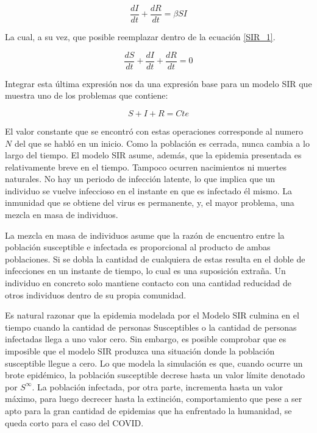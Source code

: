 \begin{equation} \frac{dI}{dt} + \frac{dR}{dt} = \beta S I \end{equation}

La cual, a su vez, que posible reemplazar dentro de la ecuación \eqref{SIR_1}.

\begin{equation} \frac{dS}{dt} + \frac{dI}{dt} + \frac{dR}{dt} = 0 \end{equation}

Integrar esta última expresión nos da una expresión base para un modelo SIR que muestra uno de los problemas que contiene:

\begin{equation} S + I + R = Cte \end{equation}

El valor constante que se encontró con estas operaciones corresponde al numero $N$ del que se habló en un inicio. Como la población es cerrada, nunca cambia a lo largo del tiempo. El modelo SIR asume, además, que la epidemia presentada es relativamente breve en el tiempo. Tampoco ocurren nacimientos ni muertes naturales. No hay un periodo de infección latente, lo que implica que un individuo se vuelve infeccioso en el instante en que es infectado él mismo. La inmunidad que se obtiene del virus es permanente, y, el mayor problema, una mezcla en masa de individuos.

La mezcla en masa de individuos asume que la razón de encuentro entre la población susceptible e infectada es proporcional al producto de ambas poblaciones. Si se dobla la cantidad de cualquiera de estas resulta en el doble de infecciones en un instante de tiempo, lo cual es una suposición extraña. Un individuo en concreto solo mantiene contacto con una cantidad reducidad de otros individuos dentro de su propia comunidad.

Es natural razonar que la epidemia modelada por el Modelo SIR culmina en el tiempo cuando la cantidad de personas Susceptibles o la cantidad de personas infectadas llega a uno valor cero. Sin embargo, es posible comprobar que es imposible que el modelo SIR produzca una situación donde la población susceptible llegue a cero. Lo que modela la simulación es que, cuando ocurre un brote epidémico, la población susceptible decrese hasta un valor límite denotado por $S^\infty$. La población infectada, por otra parte, incrementa hasta un valor máximo, para luego decrecer hasta la extinción, comportamiento que pese a ser apto para la gran cantidad de epidemias que ha enfrentado la humanidad, se queda corto para el caso del COVID.

